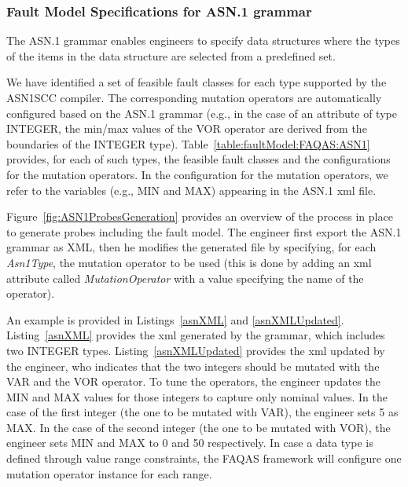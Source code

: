 \ENDCHANGEDWPT

\clearpage

\subsubsection{Fault Model Specifications for ASN.1 grammar}
\label{subsub:asn1model}

The ASN.1 grammar enables engineers to specify data structures where the types of the items in the data structure are selected from a predefined set.


We have identified a set of feasible fault classes for each type supported by the ASN1SCC compiler.
The corresponding mutation operators are automatically configured based on the ASN.1 grammar (e.g., in the case of an attribute of type INTEGER, the min/max values of the VOR operator are derived from the boundaries of the INTEGER type).
Table~\ref{table:faultModel:FAQAS:ASN1} provides, for each of such types, the feasible fault classes and the configurations for the mutation operators.
In the configuration for the mutation operators, we refer to the variables (e.g., MIN and MAX) appearing in the ASN.1 xml file.

Figure~\ref{fig:ASN1ProbesGeneration} provides an overview of the process in place to generate probes including the fault model.
The engineer first export the ASN.1 grammar as XML, then he modifies the generated file by specifying, for each \emph{Asn1Type}, the mutation operator to be used (this is done by adding an xml attribute called \emph{MutationOperator} with a value specifying the name of the operator). 

An example is provided in Listings~\ref{asnXML} and \ref{asnXMLUpdated}. Listing~\ref{asnXML} provides the xml generated by the grammar, which includes two INTEGER types.
Listing~\ref{asnXMLUpdated} provides the xml updated by the engineer, who indicates that the two integers should be mutated with the VAR and the VOR operator. To tune the operators, the engineer updates the MIN and MAX values for those integers to capture only nominal values. 
In the case of the first integer (the one to be mutated with VAR), the engineer sets 5 as MAX.
In the case of the second integer (the one to be mutated with VOR), the engineer sets MIN and MAX to 0 and 50 respectively.
In case a data type is defined through value range constraints, the FAQAS framework will configure one mutation operator instance for each range.

